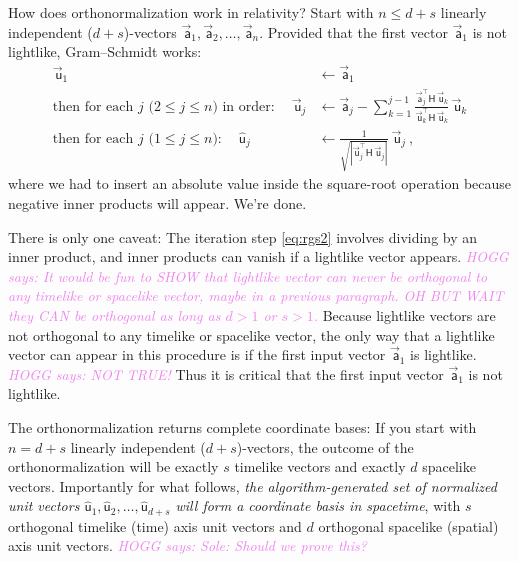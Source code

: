 \documentclass{article}
\newcommand{\metric}{\mathsf{H}}
\newcommand\upvec[1]{\!\vec{\,\mathrm{#1}}}
\newcommand{\Lvec}[1]{\upvec{\mathsf{#1}}} %
\newcommand{\Lhat}[1]{\hat{\mathsf{#1}}} %
\newcommand{\plus}{\!+\!} %
\newcommand{\HOGG}[1]{\textcolor{violet}{\textsl{HOGG says: {#1}}}}
\begin{document}
How does orthonormalization work in relativity?
Start with $n\leq d+s$ linearly independent ($d\plus s$)-vectors $\Lvec{a}_1,\Lvec{a}_2,\ldots,\Lvec{a}_n$.
Provided that the first vector $\Lvec{a}_1$ is not lightlike, Gram--Schmidt works:
\begin{align}
    \Lvec{u}_1 &\leftarrow \Lvec{a}_1 \label{eq:rgs1}
    \\
    \mbox{then for each $j$ ($2\leq j\leq n$) in order:} \quad~ \Lvec{u}_j &\leftarrow \Lvec{a}_j - \sum_{k=1}^{j-1} \frac{\Lvec{a}_j^\top\metric\,\Lvec{u}_k}{\Lvec{u}_k^\top\metric\,\Lvec{u}_k}\,\Lvec{u}_k \label{eq:rgs2}
    \\
    \mbox{then for each $j$ ($1\leq j\leq n$):} \quad~ \Lhat{u}_j &\leftarrow \frac{1}{\sqrt{|\Lvec{u}_j^\top\metric\,\Lvec{u}_j|}}\,\Lvec{u}_j ~, \label{eq:rgs3}
\end{align}
where we had to insert an absolute value inside the square-root operation because negative inner products will appear.
We're done.

There is only one caveat:
The iteration step \eqref{eq:rgs2} involves dividing by an inner product, and inner products can vanish if a lightlike vector appears.
\HOGG{It would be fun to SHOW that lightlike vector can never be orthogonal to any timelike or spacelike vector, maybe in a previous paragraph. OH BUT WAIT they CAN be orthogonal as long as $d>1$ or $s>1$.}
Because lightlike vectors are not orthogonal to any timelike or spacelike vector, the only way that a lightlike vector can appear in this procedure is if the first input vector $\Lvec{a}_1$ is lightlike.
\HOGG{NOT TRUE!}
Thus it is critical that the first input vector $\Lvec{a}_1$ is not lightlike.

The orthonormalization returns complete coordinate bases:
If you start with $n=d+s$ linearly independent ($d\plus s$)-vectors, the outcome of the orthonormalization will be exactly $s$ timelike vectors and exactly $d$ spacelike vectors.
Importantly for what follows, \emph{the algorithm-generated set of normalized unit vectors $\Lhat{u}_1,\Lhat{u}_2,\ldots,\Lhat{u}_{d+s}$ will form a coordinate basis in spacetime}, with $s$ orthogonal timelike (time) axis unit vectors and $d$ orthogonal spacelike (spatial) axis unit vectors.
\HOGG{Sole: Should we prove this?}
\end{document}
